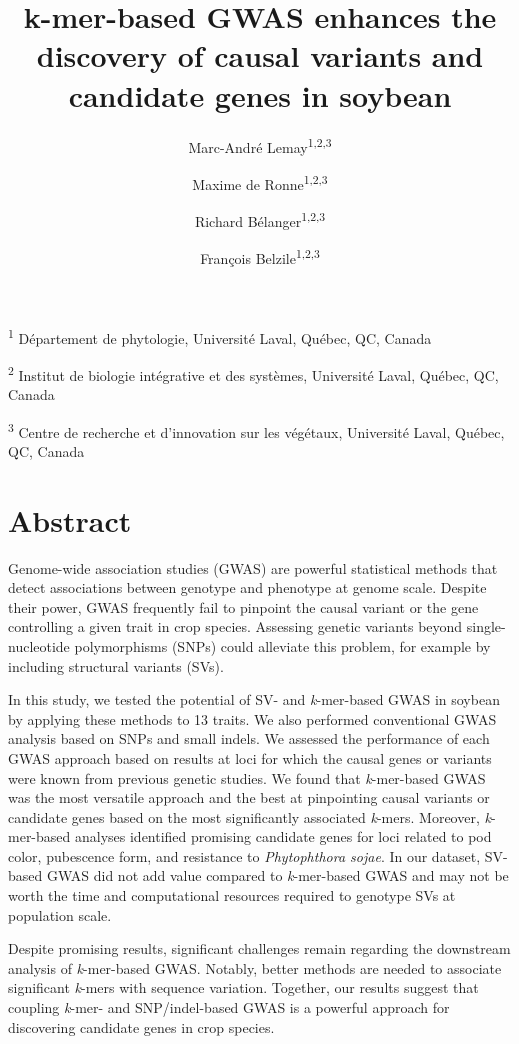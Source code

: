 \documentclass{article}
\title{k-mer-based GWAS enhances the discovery of causal variants and candidate genes in soybean}
\date{}
\author{Marc-André Lemay\textsuperscript{1,2,3} \and
Maxime de Ronne\textsuperscript{1,2,3} \and
Richard Bélanger\textsuperscript{1,2,3} \and
François Belzile\textsuperscript{1,2,3}}
\begin{document}
\maketitle

\textsuperscript{1} Département de phytologie, Université Laval, Québec, QC, Canada

\textsuperscript{2} Institut de biologie intégrative et des systèmes, Université Laval, Québec, QC, Canada

\textsuperscript{3} Centre de recherche et d’innovation sur les végétaux, Université Laval, Québec, QC, Canada

\section*{Abstract}

Genome-wide association studies (GWAS) are powerful statistical methods that
detect associations between genotype and phenotype at genome scale. Despite
their power, GWAS frequently fail to pinpoint the causal variant or the gene
controlling a given trait in crop species. Assessing genetic
variants beyond single-nucleotide polymorphisms (SNPs) could alleviate this
problem, for example by including structural variants (SVs).

In this study, we tested the potential of SV- and \emph{k}-mer-based GWAS in
soybean by applying these methods to 13 traits.  We also performed
conventional GWAS analysis based on SNPs and small indels.  We assessed the performance of each GWAS approach based on
results at loci for which the causal genes or variants were known from
previous genetic studies. We found that \emph{k}-mer-based GWAS was the
most versatile approach and the best at pinpointing causal variants or
candidate genes based on the most significantly associated
\emph{k}-mers.  Moreover, \textit{k}-mer-based analyses identified
promising candidate genes for loci related to pod color, pubescence
form, and resistance to \textit{Phytophthora sojae}. In
our dataset, SV-based GWAS did not add value compared to
\textit{k}-mer-based GWAS and may not be worth the time and
computational resources required to genotype SVs at population scale.

Despite promising results, significant challenges remain regarding the
downstream analysis of \emph{k}-mer-based GWAS.  Notably, better
methods are needed to associate significant \emph{k}-mers with sequence
variation. Together, our results suggest that coupling \emph{k}-mer-
and SNP/indel-based GWAS is a powerful approach for discovering
candidate genes in crop species.
\end{document}
